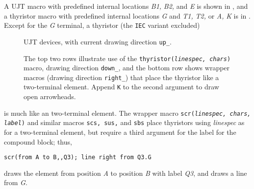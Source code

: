 \pagebreak
A UJT macro with predefined internal locations {\sl B1,} {\sl B2,}
and {\sl E} is shown in ,
and a thyristor macro with predefined internal locations
 {\sl G} and {\sl T1,} {\sl T2,} or
 {\sl A,} {\sl K} is in .
Except for the {\sl G} terminal, a thyristor (the {\tt IEC} variant excluded)
\begin{figure}[h!t]
   
   \caption{UJT devices, with current drawing direction {\tt up\_}. }
   \label{ujt}
   \end{figure}
\begin{figure}[h!t]
   
   \vspace*{-1ex}
   \caption{The top two rows illustrate use of the
    {\tt thyristor({\sl linespec, chars})} macro,
    drawing direction {\tt down\_}, and the bottom row shows wrapper
    macros (drawing direction {\tt right\_}) that place
    the thyristor like a two-terminal element. Append {\tt K}
    to the second argument to draw open arrowheads.}
   \label{thyristor}
   \end{figure}
is much like an two-terminal element.  The wrapper macro
{\tt scr({\sl linespec, chars, label})} and similar macros
{\tt scs, sus,} and {\tt sbs} place thyristors
using {\sl linespec} as for a two-terminal element,
but require a third argument for the label for the compound block; thus,

{\tt scr(from A to B,{,}Q3); line right from Q3.G}

\noindent
draws the element from position {\sl A} to position {\sl B} with label
{\sl Q3}, and draws a line from {\sl G}.

